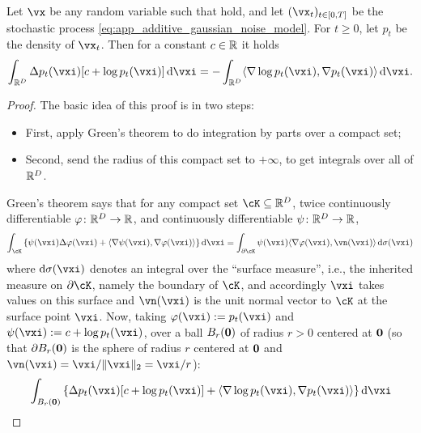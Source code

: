 \documentclass[../../book-main.tex]{subfiles}
\begin{document}
\begin{lemma}\label{lem:diffusion_ibp}
    Let \(\vx\) be any random variable such that  hold, and let \((\vx_{t})_{t \in [0, T]}\) be the stochastic process \eqref{eq:app_additive_gaussian_noise_model}. For \(t \geq 0\), let \(p_{t}\) be the density of \(\vx_{t}\). Then for a constant \(c \in \mathbb{R}\) it holds 
    \begin{equation}
        \int_{\R^{D}}\Delta p_{t}(\vxi)[c + \log p_{t}(\vxi)]\odif{\vxi} = -\int_{\R^{D}}\ip{\nabla \log p_{t}(\vxi)}{\nabla p_{t}(\vxi)}\odif{\vxi}.
    \end{equation}
\end{lemma}
\begin{proof}
    The basic idea of this proof is in two steps:
    \begin{itemize}
        \item First, apply Green's theorem to do integration by parts over a compact set;
        \item Second, send the radius of this compact set to \(+\infty\), to get integrals over all of \(\mathbb{R}^{D}\).
    \end{itemize}
    Green's theorem says that for any compact set \(\cK \subseteq \R^{D}\), twice continuously differentiable \(\plainphi \colon \R^{D} \to \R\), and continuously differentiable \(\psi \colon \mathbb{R}^{D} \to \mathbb{R}\),
    \begin{equation}
        \int_{\cK}\bc{\psi(\vxi) \Delta \plainphi(\vxi) + \ip{\nabla \psi(\vxi)}{\nabla \plainphi(\vxi)}}\odif{\vxi} = \int_{\partial \cK}\psi(\vxi)\ip{\nabla \plainphi(\vxi)}{\vn(\vxi)}\odif{\sigma(\vxi)}
    \end{equation}
    where \(\odif{\sigma(\vxi)}\) denotes an integral over the ``surface measure'', i.e., the inherited measure on \(\partial \cK\), namely the boundary of \(\cK\), and accordingly \(\vxi\) takes values on this surface and \(\vn(\vxi)\) is the unit normal vector to \(\cK\) at the surface point \(\vxi\). Now, taking \(\plainphi(\vxi) := p_{t}(\vxi)\) and \(\psi(\vxi) := c + \log p_{t}(\vxi)\), over a ball \(B_{r}(\bm{0})\) of radius \(r > 0\) centered at \(\bm{0}\) (so that \(\partial B_{r}(\bm{0})\) is the sphere of radius \(r\) centered at \(\bm{0}\) and \(\vn(\vxi) = \vxi/\norm{\vxi}_{2} = \vxi/r\)):
    \begin{align}
        &\int_{B_{r}(\vzero)}\bc{\Delta p_{t}(\vxi)[c + \log p_{t}(\vxi)] + \ip{\nabla \log p_{t}(\vxi)}{\nabla p_{t}(\vxi)}}\odif{\vxi} \\

\end{align}
\end{proof}
\end{document}
